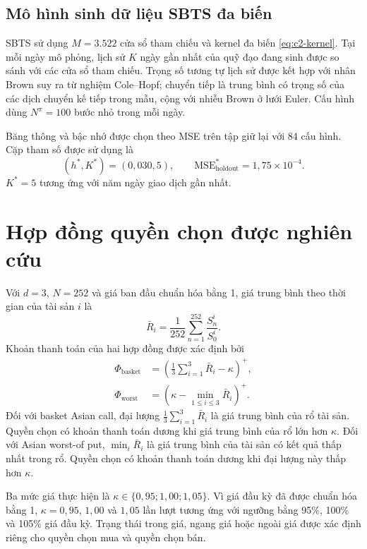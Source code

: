 \subsection{Mô hình sinh dữ liệu SBTS đa biến}

SBTS sử dụng $M=3.522$ cửa sổ tham chiếu và kernel đa biến
\eqref{eq:c2-kernel}. Tại mỗi ngày mô phỏng, lịch sử $K$ ngày gần nhất của quỹ
đạo đang sinh được so sánh với các cửa sổ tham chiếu. Trọng số tương tự lịch
sử được kết hợp với nhân Brown suy ra từ nghiệm Cole--Hopf; chuyển tiếp là
trung bình có trọng số của các dịch chuyển kế tiếp trong mẫu, cộng với nhiễu
Brown ở lưới Euler. Cấu hình dùng $N^{\pi}=100$ bước nhỏ trong mỗi ngày.

Băng thông và bậc nhớ được chọn theo MSE trên tập giữ lại với 84 cấu hình. Cặp
tham số được sử dụng là
\begin{equation}
    (h^{*},K^{*})=(0{,}030,5),
    \qquad \mathrm{MSE}^{*}_{\mathrm{holdout}}=1{,}75\times10^{-4}.
    \label{eq:c3-hk-result}
\end{equation}
$K^{*}=5$ tương ứng với năm ngày giao dịch gần nhất.

\section{Hợp đồng quyền chọn được nghiên cứu}
\label{sec:c3-contracts}

Với $d=3$, $N=252$ và giá ban đầu chuẩn hóa bằng 1, giá trung bình theo thời
gian của tài sản $i$ là
\begin{equation}
    \bar R_i=\frac{1}{252}\sum_{n=1}^{252}\frac{S_n^i}{S_0^i}.
    \label{eq:c3-average-normalized-price}
\end{equation}
Khoản thanh toán của hai hợp đồng được xác định bởi
\begin{align}
    \Phi_{\mathrm{basket}}
    &=\left(\frac13\sum_{i=1}^{3}\bar R_i-\kappa\right)^{+},
    \label{eq:c3-basket}\\
    \Phi_{\mathrm{worst}}
    &=\left(\kappa-\min_{1\le i\le3}\bar R_i\right)^{+}.
    \label{eq:c3-worst}
\end{align}
Đối với basket Asian call, đại lượng
$\frac{1}{3}\sum_{i=1}^{3}\bar R_i$ là giá trung bình của rổ tài sản. Quyền
chọn có khoản thanh toán dương khi giá trung bình của rổ lớn hơn $\kappa$.
Đối với Asian worst-of put, $\min_i\bar R_i$ là giá trung bình của tài sản có
kết quả thấp nhất trong rổ. Quyền chọn có khoản thanh toán dương khi đại lượng
này thấp hơn $\kappa$.

Ba mức giá thực hiện là
$\kappa\in\{0{,}95;1{,}00;1{,}05\}$. Vì giá đầu kỳ đã được chuẩn hóa bằng 1,
$\kappa=0{,}95$, $1{,}00$ và $1{,}05$ lần lượt tương ứng với ngưỡng bằng 95\%,
100\% và 105\% giá đầu kỳ. Trạng thái trong giá, ngang giá hoặc ngoài giá được
xác định riêng cho quyền chọn mua và quyền chọn bán.

